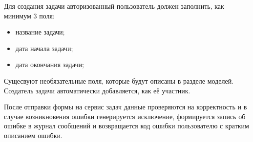 Для создания задачи авторизованный пользователь должен заполнить, как минимум 3 поля:
\begin{itemize}
    \item название задачи;
    \item дата начала задачи;
    \item дата окончания задачи;
\end{itemize}

Сущесвуют необязательные поля, которые будут описаны в разделе моделей.
Создатель задачи автоматически добавляется, как её участник.

После отправки формы на сервис задач данные проверяются на корректность и в случае возникновения ошибки генерируется
исключение, формируется запись об ошибке в журнал сообщений и возвращается код ошибки пользователю с кратким описанием ошибки. 